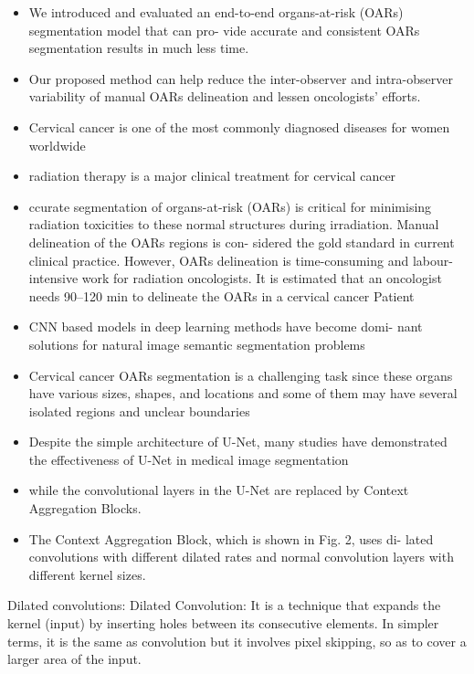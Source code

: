 \documentclass[11pt]{article}
\begin{document}
\begin{itemize}
    \item We introduced and evaluated an end-to-end organs-at-risk (OARs) segmentation model that can pro-
    vide accurate and consistent OARs segmentation results in much less time.
    \item Our proposed method can help reduce the inter-observer and intra-observer variability of manual
    OARs delineation and lessen oncologists’ efforts. 
    \item Cervical cancer is one of the most commonly diagnosed diseases for
    women worldwide
    \item radiation therapy is a major clinical treatment
    for cervical cancer
    \item ccurate segmentation of organs-at-risk (OARs)
    is critical for minimising radiation toxicities to these normal structures
    during irradiation. Manual delineation of the OARs regions is con-
    sidered the gold standard in current clinical practice. However, OARs
    delineation is time-consuming and labour-intensive work for radiation
    oncologists. It is estimated that an oncologist needs 90–120 min to
    delineate the OARs in a cervical cancer Patient
    \item CNN based models in deep learning methods have become domi-
    nant solutions for natural image semantic segmentation problems
    \item Cervical cancer OARs segmentation is a challenging task since these
    organs have various sizes, shapes, and locations and some of them may
    have several isolated regions and unclear boundaries
    \item Despite
    the simple architecture of U-Net, many studies have demonstrated the
    effectiveness of U-Net in medical image segmentation
    \item while the convolutional layers in the U-Net are replaced
    by Context Aggregation Blocks.
    \item The Context Aggregation Block, which is shown in Fig. 2, uses di-
    lated convolutions with different dilated rates and normal convolution
    layers with different kernel sizes.
\end{itemize}

Dilated convolutions: Dilated Convolution: It is a technique that expands the kernel (input) by inserting holes between its consecutive elements. In simpler terms, it is the same as convolution but it involves pixel skipping, so as to cover a larger area of the input. 
\end{document}
